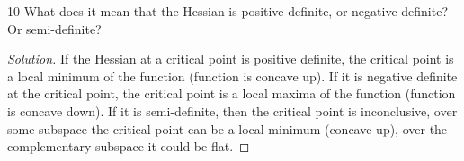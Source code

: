 \documentclass{article}
\newenvironment{solution}
{\renewcommand\qedsymbol{$\blacksquare$}\begin{proof}[Solution]}
{\end{proof}}
\begin{document}
\bigskip

\begin{PROB}{10}\label{Problem 10.}
    What does it mean that the Hessian is positive definite, or negative definite? Or semi-definite? 
\end{PROB}
\begin{solution}
    If the Hessian at a critical point is positive definite, the critical point is a local minimum of the function (function is concave up). If it is negative definite at the critical point, the critical point is a local maxima of the function (function is concave down). If it is semi-definite, then the critical point is inconclusive, over some subspace the critical point can be a local minimum (concave up), over the complementary subspace it could be flat.
\end{solution}

\bigskip
\end{document}

